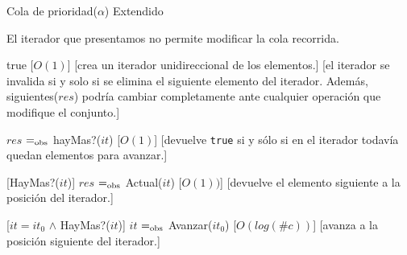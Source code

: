 \begin{Interfaz}

  \begin{tad}{Cola de prioridad($\alpha$) Extendido}
    \parskip=0pt
    
    \tadAxiomas
  \end{tad}


	El iterador que presentamos no permite modificar la cola recorrida.

	{true}
	[$O(1)$]
	[crea un iterador unidireccional de los elementos.]
	[el iterador se invalida si y solo si se elimina el siguiente elemento del iterador. Además, siguientes($res$) podría cambiar completamente ante cualquier operación que modifique el conjunto.]

	{$res$ $=_{\mathrm{obs}}$ hayMas?($it$)}
	[$O(1)$]
	[devuelve \texttt{true} si y sólo si en el iterador todavía quedan elementos para avanzar.]

	[HayMas?($it$)]
	{$res$ $=_{\mathrm{obs}}$ Actual($it$)}
	[$O(1))$]
	[devuelve el elemento siguiente a la posición del iterador.]

	[$it = it_0$ $\land$ HayMas?($it$)]
	{$it$ $=_{\mathrm{obs}}$ Avanzar($it_0$)}
	[$O(log(\#c))$]
	[avanza a la posición siguiente del iterador.]

\end{Interfaz}

